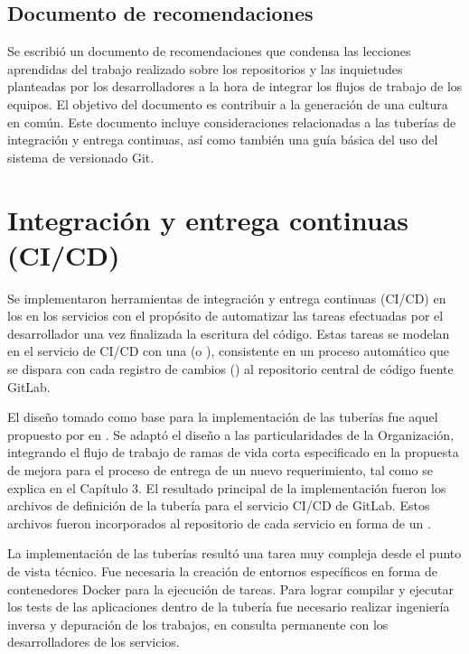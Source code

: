 \subsection{Documento de recomendaciones}

Se escribió un documento de recomendaciones que condensa las lecciones
aprendidas del trabajo realizado sobre los repositorios y las
inquietudes planteadas por los desarrolladores a la hora de integrar
los flujos de trabajo de los equipos. El objetivo del documento es
contribuir a la generación de una cultura en común. Este documento
incluye consideraciones relacionadas a las tuberías de integración y
entrega continuas, así como también una guía básica del uso del
sistema de versionado Git.

\section{Integración y entrega continuas (CI/CD)}

Se implementaron herramientas de integración y entrega continuas
(CI/CD) en los en los servicios con el propósito de automatizar las
tareas efectuadas por el desarrollador una vez finalizada la escritura
del código. Estas tareas se modelan en el servicio de CI/CD con una
 (o ), consistente en un proceso
automático que se dispara con cada registro de cambios ()
al repositorio central de código fuente GitLab.

El diseño tomado como base para la implementación de las tuberías fue
aquel propuesto por \citeauthor{humblefarley} en
\cite{humblefarley}. Se adaptó el
diseño a las particularidades de la Organización, integrando el flujo
de trabajo de ramas de vida corta especificado en la propuesta de
mejora para el proceso de entrega de un nuevo requerimiento, tal como
se explica en el Capítulo 3. El resultado principal de la
implementación fueron los archivos de definición de la tubería para el
servicio CI/CD de GitLab. Estos archivos fueron incorporados al
repositorio de cada servicio en forma de un .

La implementación de las tuberías resultó una tarea muy compleja desde
el punto de vista técnico. Fue necesaria la creación de entornos
específicos en forma de contenedores Docker para la ejecución de
tareas. Para lograr compilar y ejecutar los tests de las aplicaciones
dentro de la tubería fue necesario realizar ingeniería inversa y
depuración de los trabajos, en consulta permanente con los
desarrolladores de los servicios.

